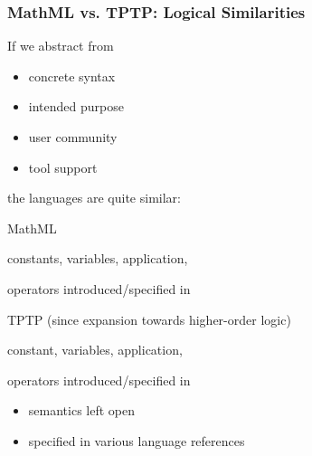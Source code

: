 \documentclass{beamer}
\begin{document}
\begin{frame}\frametitle{MathML vs. TPTP: Logical Similarities}
If we abstract from
\begin{itemize}
  \item concrete syntax
  \item intended purpose
  \item user community
  \item tool support
\end{itemize}
the languages are quite similar:

\begin{blockitems}{MathML}
 \item constants, variables, application, 
 \item {} operators introduced/specified in 
\end{blockitems}
\begin{blockitems}{TPTP (since expansion towards higher-order logic)}
 \item constant, variables, application, 
 \item {} operators introduced/specified in 
 \item {}
   \begin{itemize}
     \item semantics left open
     \item specified in various language references
    \end{itemize}
\end{blockitems}
\end{frame}
\end{document}
